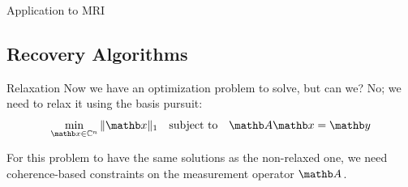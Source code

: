 \documentclass[aspectratio=169,xcolor=dvipsnames]{beamer}
\begin{document}
\begin{frame}{Application to MRI}
\end{frame}

\subsection{Recovery Algorithms}
\begin{frame}{Relaxation}
    Now we have an optimization problem to solve, but can we?
    \pause
    No; we need to relax it using the basis pursuit:
    \begin{equation*}
        \label{eq:basis-pursuit}
        \min_{\xb \in \mathbb{C}^n} \|\xb\|_1 \quad \text{subject to} \quad \Ab \xb = \yb
    \end{equation*}

    \pause
    For this problem to have the same solutions as the non-relaxed one, we need coherence-based constraints on the measurement operator $\Ab$.

\end{frame}
\end{document}
